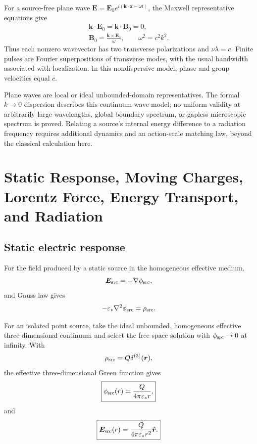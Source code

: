 \documentclass[11pt]{article}
\begin{document}
For a source-free plane wave $\bm E=\bm E_0e^{i(\bm k\cdot\bm x-\omega t)}$, the Maxwell representative equations give
\begin{equation}
\begin{gathered}
\bm k\cdot\bm E_0=\bm k\cdot\bm B_0=0,\\
\bm B_0=\frac{\bm k\times\bm E_0}{\omega},\qquad
\omega^2=c^2k^2.
\end{gathered}
\end{equation}
Thus each nonzero wavevector has two transverse polarizations and $\nu\lambda=c$. Finite pulses are Fourier superpositions of transverse modes, with the usual bandwidth associated with localization. In this nondispersive model, phase and group velocities equal $c$.

Plane waves are local or ideal unbounded-domain representatives. The formal $k\to0$ dispersion describes this continuum wave model; no uniform validity at arbitrarily large wavelengths, global boundary spectrum, or gapless microscopic spectrum is proved. Relating a source's internal energy difference to a radiation frequency requires additional dynamics and an action-scale matching law, beyond the classical calculation here.

\section{Static Response, Moving Charges, Lorentz Force, Energy Transport, and Radiation}

\subsection{Static electric response}

For the field produced by a static source in the homogeneous effective medium,
\begin{equation}
\bm E_{\rm src}=-\nabla\phi_{\rm src},
\end{equation}
and Gauss law gives
\begin{equation}
-\varepsilon_*\nabla^2\phi_{\rm src}=\rho_{\rm src}.
\end{equation}

For an isolated point source, take the ideal unbounded, homogeneous effective three-dimensional continuum and select the free-space solution with $\phi_{\rm src}\to0$ at infinity. With
\begin{equation}
\rho_{\rm src}
=
Q\delta^{(3)}(\bm r),
\end{equation}
the effective three-dimensional Green function gives
\begin{equation}
\boxed{
\phi_{\rm src}(r)
=
\frac{Q}{4\pi\varepsilon_*r},
}
\end{equation}
and
\begin{equation}
\boxed{
\bm E_{\rm src}(r)
=
\frac{Q}{4\pi\varepsilon_*r^2}
\hat{\bm r}.
}
\end{equation}
\end{document}
